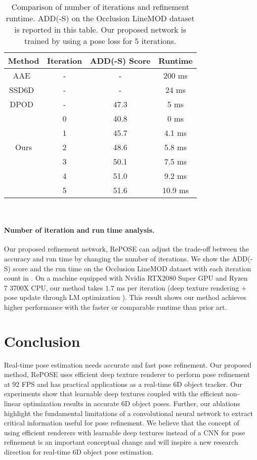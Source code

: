 \documentclass[10pt,twocolumn,letterpaper]{article}
\begin{document}
\begin{table}[t]
\caption{Comparison of number of iterations and refinement runtime. ADD(-S) on the Occlusion LineMOD dataset is reported in this table. Our proposed network is trained by using a pose loss for 5 iterations.}
\centering
\scalebox{1.0} {
\begin{tabular}{c|c||c|c}
  \hline
  Method & Iteration & ADD(-S) Score & Runtime \\ \hline
  AAE~\cite{Zakharov_2019_ICCV} & - & - & 200 ms \\
  SSD6D~\cite{Zakharov_2019_ICCV} & - & - & 24 ms \\
  DPOD~\cite{Zakharov_2019_ICCV} & - & 47.3 & 5 ms \\
\hline
  \multirow{5}{*}{Ours}
       & 0 & 40.8 & 0 ms  \\
       & 1 & 45.7 & 4.1 ms \\ & 2 & 48.6 & 5.8 ms \\ & 3 & 50.1 & 7.5 ms \\ & 4 & 51.0 & 9.2 ms \\
       & 5 & 51.6 & 10.9 ms \\ \hline
\end{tabular}
}
\label{tab:iteration_analysis}
\\\centering
\vspace*{1mm}
\end{table}

\paragraph{Number of iteration and run time analysis.}
Our proposed refinement network, RePOSE can adjust the trade-off between the accuracy and run time by changing the number of iterations.
We show the ADD(-S) score and the run time on the Occlusion LineMOD dataset with each iteration count in .
On a machine equipped with Nvidia RTX2080 Super GPU and Ryzen 7 3700X CPU, our method takes $1.7$ ms per iteration (deep texture rendering + pose update through LM optimization \cite{10.1007/BFb0067700}). This result shows our method achieves higher performance with the faster or comparable runtime than prior art. 


\section{Conclusion}
Real-time pose estimation needs accurate and fast pose refinement. Our proposed method, RePOSE uses efficient deep texture renderer to perform pose refinement at $92$ FPS and has practical applications as a real-time 6D object tracker. Our experiments show that learnable deep textures coupled with the efficient non-linear optimization results in accurate 6D object poses. Further, our ablations highlight the fundamental limitations of a convolutional neural network to extract critical information useful for pose refinement. We believe that the concept of using efficient renderers with learnable deep textures instead of a CNN for pose refinement is an important conceptual change and will inspire a new research direction for real-time 6D object pose estimation.
\end{document}
